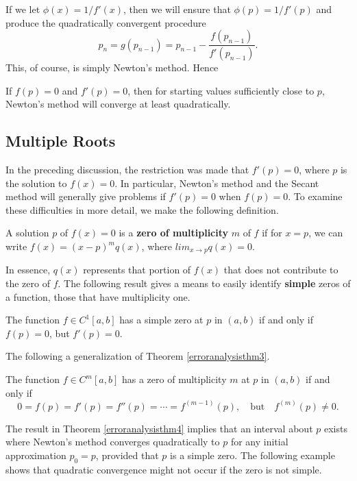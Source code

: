 If we let $\phi(x) = 1/f' (x)$, then we will ensure that $\phi(p) = 1/f'(p)$ and produce the quadratically convergent procedure
\[p_n = g(p_{n-1}) =p_{n-1}-\frac{f(p_{n-1})}{f'(p_{n-1})}.\]
This, of course, is simply Newton’s method. Hence
\begin{boxB} 
If $f(p) = 0$ and $f'(p)= 0$, then for starting values sufficiently close to $p$, Newton’s method will converge at least quadratically.
\end{boxB} 

\subsection*{ Multiple Roots}
In the preceding discussion, the restriction was made that $f'(p)= 0$, where $p$ is the solution to $f(x) = 0$. In particular, Newton’s method and the Secant method will generally give problems if $f'(p) = 0$ when $f(p) = 0$. To examine these difficulties in more detail, we make the following definition.

\begin{definition}
A solution $p$ of $f(x) = 0$ is a {\bf zero of multiplicity} $m$ of $f$ if for $x= p$, we can write $f(x) = (x-p)^mq(x)$, where $lim_{x\rightarrow p}q(x)= 0$.
\end{definition}
In essence, $q(x)$ represents that portion of $f(x)$ that does not contribute to the zero of $f$. The following result gives a means to easily identify {\bf simple} zeros of a function, those that have multiplicity one.

\begin{theorem}\label{erroranalysisthm3}
The function $f\in  C^1[a,b]$ has a simple zero at $p$ in $(a,b)$ if and only if $f(p) = 0$, but $f'(p)= 0$.
\end{theorem}
 The following a generalization of Theorem \ref{erroranalysisthm3}.
\begin{theorem}\label{erroranalysisthm4}

The function $f\in C^m[a,b]$ has a zero of multiplicity $m$ at $p$ in $(a,b)$ if and only if 
\[0=f(p)=f'(p)=f'' (p)=\cdots=f^{(m-1)}(p), \quad\mbox{but}\quad f^{(m)}(p)\neq0.\]
\end{theorem}

The result in Theorem \ref{erroranalysisthm4} implies that an interval about $p$ exists where Newton’s  method converges quadratically to $p$ for any initial approximation $p_0=p$, provided that $p$ is a simple zero. The following example shows that quadratic convergence might not occur if the zero is not simple.

